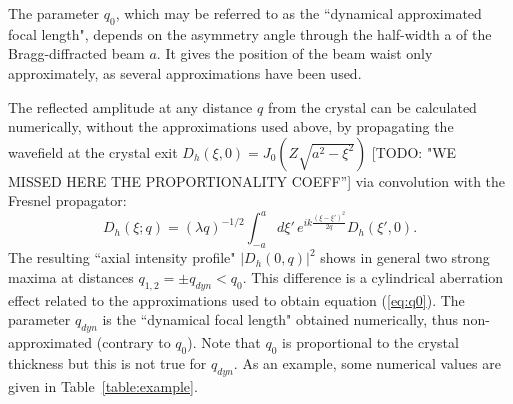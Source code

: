 \documentclass[preprint]{iucr}              %
\newcommand{\todo}[1]{{\color{red}[TODO: "#1'']}}
\newcommand{\inred}[1]{{\color{red}#1}}
\begin{document}
The parameter $q_0$, which may be referred to as the ``dynamical approximated focal length", depends on the asymmetry angle through the half-width a of the Bragg-diffracted beam $a$. It gives the position of the beam waist only approximately, as several approximations have been used.

The reflected amplitude at any distance $q$ from the crystal can be calculated numerically, without the approximations used above, by propagating the wavefield at the crystal exit $D_h(\xi,0)=J_0(Z\sqrt{a^2-\xi^2})$ \todo{WE MISSED HERE THE PROPORTIONALITY COEFF}
via convolution with the Fresnel propagator:
\begin{equation}
\label{eq:Fresnel}
    D_h(\xi; q) = (\lambda q)^{-1/2} \int_{-a}^a d\xi'  \, e^{i k 
    \frac{(\xi-\xi')^2}{2 q}} 
    D_h(\xi',0).
\end{equation}
The resulting ``axial intensity profile" $|D_h(0,q)|^2$ shows in general two strong maxima at distances $q_{1,2}=\pm q_{dyn} < q_0$. This difference is a cylindrical aberration effect related to the approximations used to obtain equation (\ref{eq:q0}). The parameter $q_{dyn}$ is the ``dynamical focal length" obtained numerically, thus non-approximated (contrary to $q_0$). Note that $q_0$ is proportional to the crystal thickness \inred{but this is not true for $q_{dyn}$}. As an example, some numerical values are given in Table~\ref{table:example}.



\end{document}

